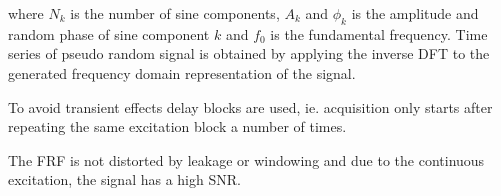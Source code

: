 \begin{itemize}
  where $N_k$ is the number of sine components, $A_k$ and $\phi_k$ is the
  amplitude and random phase of sine component $k$ and $f_0$ is the fundamental
  frequency. Time series of pseudo random signal is obtained by applying the
  inverse DFT to the generated frequency domain representation of the signal.

  To avoid transient effects delay blocks are used, ie. acquisition only starts
  after repeating the same excitation block a number of times.

  The FRF is not distorted by leakage or windowing and due to the continuous
  excitation, the signal has a high SNR.
\end{itemize}









